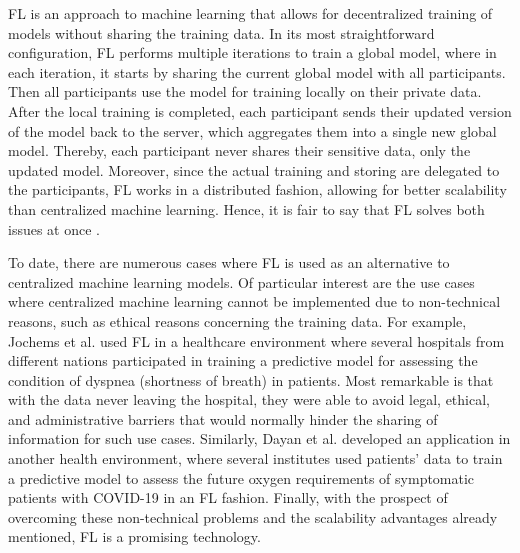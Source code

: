 \documentclass[conference]{IEEEtran}
\begin{document}
FL is an approach to machine learning that allows for decentralized training of models without sharing the training data. In its most straightforward configuration, FL performs multiple iterations to train a global model, where in each iteration, it starts by sharing the current global model with all participants. Then all participants use the model for training locally on their private data. After the local training is completed, each participant sends their updated version of the model back to the server, which aggregates them into a single new global model. Thereby, each participant never shares their sensitive data, only the updated model. Moreover, since the actual training and storing are delegated to the participants, FL works in a distributed fashion, allowing for better scalability than centralized machine learning. Hence, it is fair to say that FL solves both issues at once \cite{McMahan2017}.

To date, there are numerous cases where FL is used as an alternative to centralized machine learning models. Of particular interest are the use cases where centralized machine learning cannot be implemented due to non-technical reasons, such as ethical reasons concerning the training data. For example, Jochems et al. \cite{Jochems2016} used FL in a healthcare environment where several hospitals from different nations participated in training a predictive model for assessing the condition of dyspnea (shortness of breath) in patients. Most remarkable is that with the data never leaving the hospital, they were able to avoid legal, ethical, and administrative barriers that would normally hinder the sharing of information for such use cases. Similarly, Dayan et al. \cite{Dayan2021} developed an application in another health environment, where several institutes used patients' data to train a predictive model to assess the future oxygen requirements of symptomatic patients with COVID-19 in an FL fashion. Finally, with the prospect of overcoming these non-technical problems and the scalability advantages already mentioned, FL is a promising technology.
\end{document}
